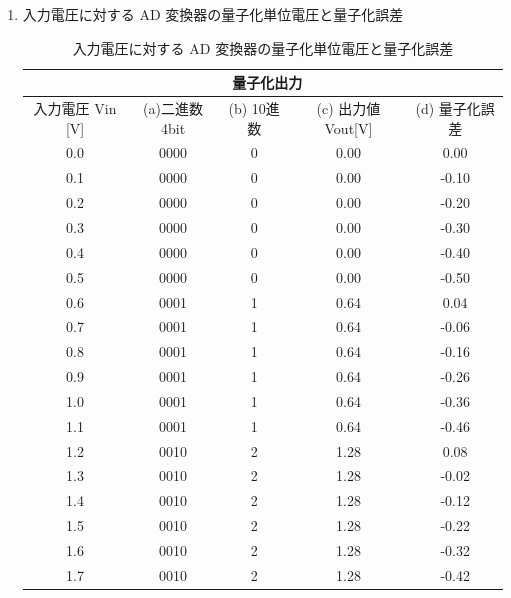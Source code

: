 \documentclass[10pt]{article}
\begin{document}
\begin{enumerate}

\item 入力電圧に対する AD 変換器の量子化単位電圧と量子化誤差

\begingroup
\setlength{\tabcolsep}{5pt} %
\renewcommand{\arraystretch}{1.5} %
\begin{table}[H]
    \centering
	\caption{入力電圧に対する AD 変換器の量子化単位電圧と量子化誤差}
    \begin{tabular}{|*{5}{c|}}  %
    \hline
    \multicolumn{1}{|c}{ } & \multicolumn{3}{|c|}{量子化出力} & \multicolumn{1}{|c|}{} \\ \hline
    \multicolumn{1}{|c}{入力電圧 Vin [V] } & \multicolumn{1}{|c|}{(a)二進数 4bit} & \multicolumn{1}{|c|}{(b) 10進数} &
    \multicolumn{1}{|c|}{(c) 出力値 Vout[V] } & \multicolumn{1}{|c|}{(d) 量子化誤差}\\ \hline
            0.0 & 0000 & 0 & 0.00 & 0.00  \\ \hline
            0.1 & 0000 & 0 & 0.00 & -0.10 \\ \hline
            0.2 & 0000 & 0 & 0.00 & -0.20 \\ \hline
            0.3 & 0000 & 0 & 0.00 & -0.30 \\ \hline
            0.4 & 0000 & 0 & 0.00 & -0.40 \\ \hline
            0.5 & 0000 & 0 & 0.00 & -0.50 \\ \hline
            0.6 & 0001 & 1 & 0.64 & 0.04  \\ \hline
            0.7 & 0001 & 1 & 0.64 & -0.06 \\ \hline
            0.8 & 0001 & 1 & 0.64 & -0.16 \\ \hline
            0.9 & 0001 & 1 & 0.64 & -0.26 \\ \hline
            1.0 & 0001 & 1 & 0.64 & -0.36 \\ \hline
            1.1 & 0001 & 1 & 0.64 & -0.46 \\ \hline
            1.2 & 0010 & 2 & 1.28 & 0.08  \\ \hline
            1.3 & 0010 & 2 & 1.28 & -0.02 \\ \hline
            1.4 & 0010 & 2 & 1.28 & -0.12 \\ \hline
            1.5 & 0010 & 2 & 1.28 & -0.22 \\ \hline
            1.6 & 0010 & 2 & 1.28 & -0.32 \\ \hline
            1.7 & 0010 & 2 & 1.28 & -0.42 \\ \hline

\end{tabular}
\end{table}
\end{enumerate}
\end{document}

